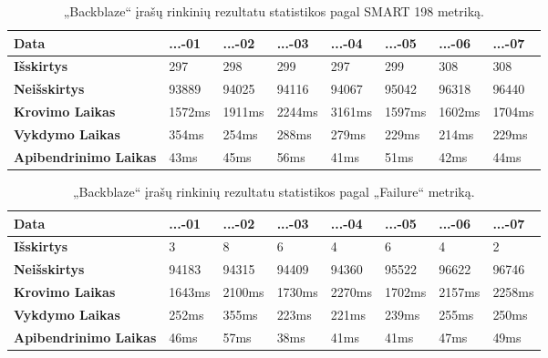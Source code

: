 \documentclass{VUMIFPSkursinis}
\begin{document}
\begin{table}[H]
\centering
\caption{„Backblaze“ įrašų rinkinių rezultatu statistikos pagal SMART 198 metriką.}
\label{tab:time198}
{\begin{tabular}{|l|l|l|l|l|l|l|l|}
\hline
\textbf{Data}                 & ...-01	   & ...-02     & ...-03     & ...-04 	  & ...-05     & ...-06     & ...-07     \\ \hline
\textbf{Išskirtys}            & 297        & 298        & 299        & 297        & 299        & 308        & 308        \\ \hline
\textbf{Neišskirtys}          & 93889      & 94025      & 94116      & 94067      & 95042      & 96318      & 96440      \\ \hline
\textbf{Krovimo Laikas}       & 1572ms     & 1911ms     & 2244ms     & 3161ms     & 1597ms     & 1602ms     & 1704ms     \\ \hline
\textbf{Vykdymo Laikas}       & 354ms      & 254ms      & 288ms      & 279ms      & 229ms      & 214ms      & 229ms      \\ \hline
\textbf{Apibendrinimo Laikas} & 43ms       & 45ms       & 56ms       & 41ms       & 51ms       & 42ms       & 44ms       \\ \hline
\end{tabular}}
\end{table}

\begin{table}[H]
\centering
\caption{„Backblaze“ įrašų rinkinių rezultatu statistikos pagal „Failure“ metriką.}
\label{tab:timeFail}
{\begin{tabular}{|l|l|l|l|l|l|l|l|}
\hline
\textbf{Data}                 & ...-01	   & ...-02     & ...-03     & ...-04 	  & ...-05     & ...-06     & ...-07     \\ \hline
\textbf{Išskirtys}            & 3          & 8          & 6          & 4          & 6          & 4          & 2          \\ \hline
\textbf{Neišskirtys}          & 94183      & 94315      & 94409      & 94360      & 95522      & 96622      & 96746      \\ \hline
\textbf{Krovimo Laikas}       & 1643ms     & 2100ms     & 1730ms     & 2270ms     & 1702ms     & 2157ms     & 2258ms     \\ \hline
\textbf{Vykdymo Laikas}       & 252ms      & 355ms      & 223ms      & 221ms      & 239ms      & 255ms      & 250ms      \\ \hline
\textbf{Apibendrinimo Laikas} & 46ms       & 57ms       & 38ms       & 41ms       & 41ms       & 47ms       & 49ms       \\ \hline
\end{tabular}}
\end{table}
\end{document}
